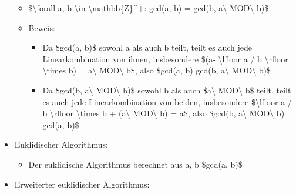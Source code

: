 \documentclass[a4paper]{article}
\begin{document}
\begin{multicols}{3}
\begin{itemize}
              \begin{itemize}
                  \item
                        \$\textbackslash forall a, b \textbackslash in
                        \textbackslash mathbb\{Z\}\^{}+: gcd(a, b) = gcd(b,
                        a\textbackslash{} MOD\textbackslash{} b)\$
                  \item
                        Beweis:

                        \begin{itemize}
                            \item
                                  Da \$gcd(a, b)\$ sowohl a als auch b teilt, teilt es auch jede
                                  Linearkombination von ihnen, insbesondere \$(a-
                                  \textbackslash lfloor a / b \textbackslash rfloor
                                  \textbackslash times b) = a\textbackslash{} MOD\textbackslash{}
                                  b\$, also \$gcd(a, b) \textbar{} gcd(b, a\textbackslash{}
                                  MOD\textbackslash{} b)\$
                            \item
                                  Da \$gcd(b, a\textbackslash{} MOD\textbackslash{} b)\$ sowohl b
                                  als auch \$a\textbackslash{} MOD\textbackslash{} b\$ teilt, teilt
                                  es auch jede Linearkombination von beiden, insbesondere
                                  \$\textbackslash lfloor a / b \textbackslash rfloor
                                  \textbackslash times b + (a\textbackslash{} MOD\textbackslash{} b)
                                  = a\$, also \$gcd(b, a\textbackslash{} MOD\textbackslash{} b)
                                  \textbar{} gcd(a, b)\$
                        \end{itemize}
              \end{itemize}
        \item
              Euklidischer Algorithmus:

              \begin{itemize}
                  \item
                        Der euklidische Algorithmus berechnet aus a, b \$gcd(a, b)\$
              \end{itemize}

        \item
              Erweiterter euklidischer Algorithmus:


\end{itemize}
\end{multicols}
\end{document}
